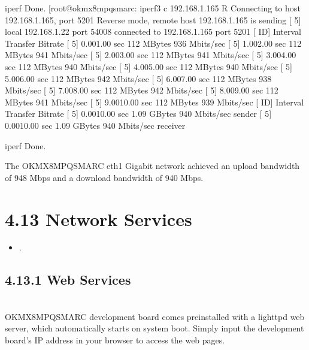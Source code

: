 \documentclass[letterpaper,10pt,openany,english]{sphinxmanual}
\begin{document}
\begin{sphinxVerbatim}[commandchars=\\\{\}]
iperf Done.       
[root@ok\PYGZhy{}mx8mpq\PYGZhy{}smarc:\PYGZti{}\PYGZsh{} iperf3 \PYGZhy{}c 192.168.1.165 \PYGZhy{}R
Connecting to host 192.168.1.165, port 5201
Reverse mode, remote host 192.168.1.165 is sending
[  5] local 192.168.1.22 port 54008 connected to 192.168.1.165 port 5201
[ ID] Interval           Transfer     Bitrate
[  5]   0.00\PYGZhy{}1.00   sec   112 MBytes   936 Mbits/sec                  
[  5]   1.00\PYGZhy{}2.00   sec   112 MBytes   941 Mbits/sec                  
[  5]   2.00\PYGZhy{}3.00   sec   112 MBytes   941 Mbits/sec                  
[  5]   3.00\PYGZhy{}4.00   sec   112 MBytes   940 Mbits/sec                  
[  5]   4.00\PYGZhy{}5.00   sec   112 MBytes   940 Mbits/sec                  
[  5]   5.00\PYGZhy{}6.00   sec   112 MBytes   942 Mbits/sec                  
[  5]   6.00\PYGZhy{}7.00   sec   112 MBytes   938 Mbits/sec                  
[  5]   7.00\PYGZhy{}8.00   sec   112 MBytes   942 Mbits/sec                  
[  5]   8.00\PYGZhy{}9.00   sec   112 MBytes   941 Mbits/sec                  
[  5]   9.00\PYGZhy{}10.00  sec   112 MBytes   939 Mbits/sec                  
\PYGZhy{} \PYGZhy{} \PYGZhy{} \PYGZhy{} \PYGZhy{} \PYGZhy{} \PYGZhy{} \PYGZhy{} \PYGZhy{} \PYGZhy{} \PYGZhy{} \PYGZhy{} \PYGZhy{} \PYGZhy{} \PYGZhy{} \PYGZhy{} \PYGZhy{} \PYGZhy{} \PYGZhy{} \PYGZhy{} \PYGZhy{} \PYGZhy{} \PYGZhy{} \PYGZhy{} \PYGZhy{}
[ ID] Interval           Transfer     Bitrate
[  5]   0.00\PYGZhy{}10.00  sec  1.09 GBytes   940 Mbits/sec                  sender
[  5]   0.00\PYGZhy{}10.00  sec  1.09 GBytes   940 Mbits/sec                  receiver

iperf Done.
\end{sphinxVerbatim}

\sphinxAtStartPar
The OK\sphinxhyphen{}MX8MPQ\sphinxhyphen{}SMARC eth1 Gigabit network achieved an upload bandwidth of 948 Mbps and a download bandwidth of 940 Mbps.


\section{4.13 Network Services}
\label{\detokenize{linux-manual:network-services}}
\sphinxAtStartPar
{}
\begin{itemize}
\item {} 
\sphinxAtStartPar
{}.

\end{itemize}


\subsection{4.13.1 Web Services}
\label{\detokenize{linux-manual:web-services}}
\sphinxAtStartPar
{}\\
OK\sphinxhyphen{}MX8MPQ\sphinxhyphen{}SMARC development board comes pre\sphinxhyphen{}installed with a lighttpd web server, which automatically starts on system boot. Simply input the development board’s IP address in your browser to access the web pages.
\end{document}
